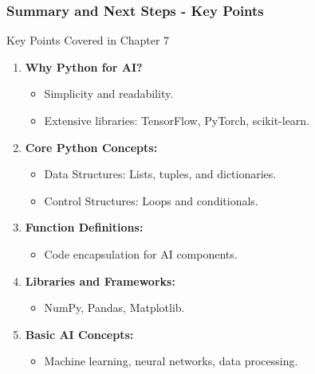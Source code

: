 \documentclass[aspectratio=169]{beamer}
\begin{document}
\begin{frame}[fragile]
    \frametitle{Summary and Next Steps - Key Points}
    \begin{block}{Key Points Covered in Chapter 7}
        \begin{enumerate}
            \item \textbf{Why Python for AI?}
            \begin{itemize}
                \item Simplicity and readability.
                \item Extensive libraries: TensorFlow, PyTorch, scikit-learn.
            \end{itemize}
            
            \item \textbf{Core Python Concepts:}
            \begin{itemize}
                \item Data Structures: Lists, tuples, and dictionaries.
                \item Control Structures: Loops and conditionals.
            \end{itemize}
            
            \item \textbf{Function Definitions:}
            \begin{itemize}
                \item Code encapsulation for AI components.
            \end{itemize}
            
            \item \textbf{Libraries and Frameworks:}
            \begin{itemize}
                \item NumPy, Pandas, Matplotlib.
            \end{itemize}
            
            \item \textbf{Basic AI Concepts:}
            \begin{itemize}
                \item Machine learning, neural networks, data processing.
            \end{itemize}
        \end{enumerate}
    \end{block}
\end{frame}
\end{document}
